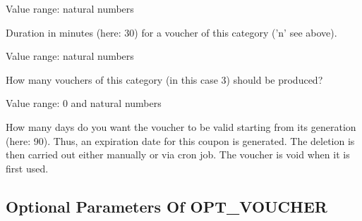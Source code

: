 \begin{description}

  Value range: natural numbers

  Duration in minutes (here: 30) for a voucher of this category ('n' see above).



  Value range: natural numbers

  How many vouchers of this category (in this case 3) should be produced?



  Value range: 0 and natural numbers

  How many days do you want the voucher to be valid starting from its generation (here: 90).
  Thus, an expiration date for this coupon is generated. The deletion is then carried out
  either manually or via cron job. The voucher is void when it is first used.


\end{description}

\subsection {Optional Parameters Of OPT\_VOUCHER}

